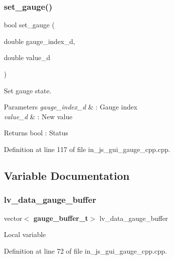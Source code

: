 \mbox{\label{group___gauge_ga34109c01880fe7fe2c117e56de4d8f39}} 
\subsubsection{set\_gauge()}
{\footnotesize\ttfamily bool set\+\_\+gauge (\begin{DoxyParamCaption}\item[{double}]{gauge\+\_\+index\+\_\+d,  }\item[{double}]{value\+\_\+d }\end{DoxyParamCaption})}



Set gauge state. 


\begin{DoxyParams}{Parameters}
{\em gauge\+\_\+index\+\_\+d} & \+: Gauge index \\
\hline
{\em value\+\_\+d} & \+: New value \\
\hline
\end{DoxyParams}
\begin{DoxyReturn}{Returns}
bool \+: Status 
\end{DoxyReturn}


Definition at line 117 of file in\+\_\+js\+\_\+gui\+\_\+gauge\+\_\+cpp.\+cpp.



\subsection{Variable Documentation}
\mbox{\label{group___gauge_ga186e7071ff2351292b9b12a7fb0241d1}} 
\subsubsection{lv\_data\_gauge\_buffer}
{\footnotesize\ttfamily vector$<$\textbf{ gauge\+\_\+buffer\+\_\+t}$>$ lv\+\_\+data\+\_\+gauge\+\_\+buffer}

Local variable 

Definition at line 72 of file in\+\_\+js\+\_\+gui\+\_\+gauge\+\_\+cpp.\+cpp.

